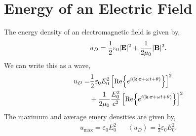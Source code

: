 \documentclass{book}
\begin{document}
\section{Energy of an Electric Field}
The energy density of an electromagnetic field is given by,
\begin{equation}
	u_D = \frac{1}{2}\varepsilon_0 |\vb{E}|^2 + \frac{1}{2\mu_0}|\vb{B}|^2.
\end{equation}
We can write this as a wave,
\begin{equation}
	\begin{split}
	u_D =& \frac{1}{2}\varepsilon_0 E_0^2 \left[\Re{e^{i(\vb{k}\cdot\vb{r} + \omega t + \theta)}}\right]^2 \\
	& + \frac{1}{2\mu_0}\frac{E_0^2}{c^2}\left[\Re{e^{i(\vb{k}\cdot\vb{r}+\omega t + \theta)}}\right]^2
	\end{split}
\end{equation}
The maximum and average emery densities are given by,
\begin{align}
	u_{\text{max}} = \varepsilon_0E_0^2 && \left<u_D\right> = \frac{1}{2} \varepsilon_0E_0^2.
\end{align}
\end{document}
